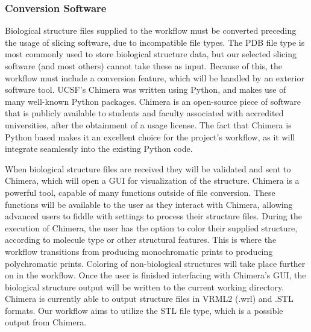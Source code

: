 \documentclass[letterpaper, onecolumn, draftclsnofoot, 10pt, compsoc]{IEEEtran}
\begin{document}
\begin{singlespace}
        \subsubsection{Conversion Software}
        Biological structure files supplied to the workflow must be converted preceding the usage of slicing software, due to incompatible file types.
        The PDB file type is most commonly used to store biological structure data, but our selected slicing software (and most others) cannot take these as input.
        Because of this, the workflow must include a conversion feature, which will be handled by an exterior software tool.
        UCSF's Chimera was written using Python, and makes use of many well-known Python packages.
        Chimera is an open-source piece of software that is publicly available to students and faculty associated with accredited universities, after the obtainment of a usage license.
        The fact that Chimera is Python based makes it an excellent choice for the project's workflow, as it will integrate seamlessly into the existing Python code.\par
        
        When biological structure files are received they will be validated and sent to Chimera, which will open a GUI for visualization of the structure.
        Chimera is a powerful tool, capable of many functions outside of file conversion.
        These functions will be available to the user as they interact with Chimera, allowing advanced users to fiddle with settings to process their structure files.
        During the execution of Chimera, the user has the option to color their supplied structure, according to molecule type or other structural features.
        This is where the workflow transitions from producing monochromatic prints to producing polychromatic prints.
        Coloring of non-biological structures will take place further on in the workflow. 
        Once the user is finished interfacing with Chimera's GUI, the biological structure output will be written to the current working directory. 
        Chimera is currently able to output structure files in VRML2 (.wrl) and .STL formats.
        Our workflow aims to utilize the STL file type, which is a possible output from Chimera.
        

\end{singlespace}
\end{document}
